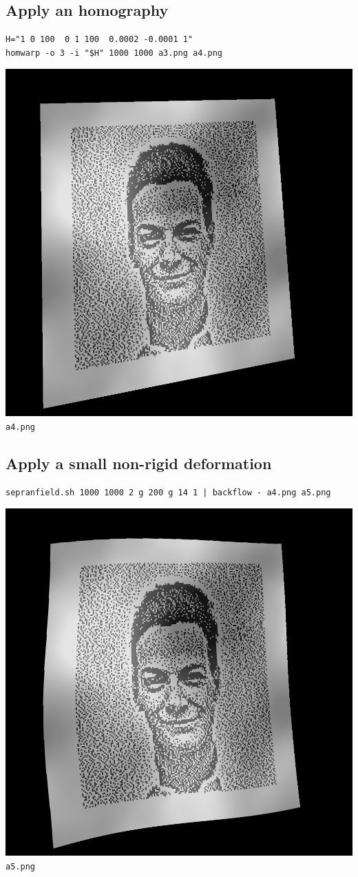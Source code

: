 \subsection{Apply an homography}
\begin{verbatim}
H="1 0 100  0 1 100  0.0002 -0.0001 1"
homwarp -o 3 -i "$H" 1000 1000 a3.png a4.png
\end{verbatim}
\includegraphics{a4.png}\verb+a4.png+

\subsection{Apply a small non-rigid deformation}
\begin{verbatim}
sepranfield.sh 1000 1000 2 g 200 g 14 1 | backflow - a4.png a5.png
\end{verbatim}
\includegraphics{a5.png}\verb+a5.png+

